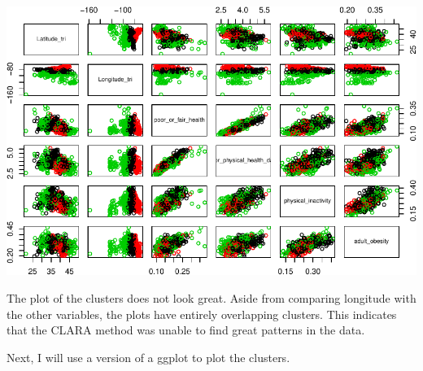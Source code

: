 \documentclass[12pt,twoside]{amherstthesis}
\begin{document}
  \begin{Shaded}
  \begin{Highlighting}[]
  \OperatorTok{$}
  \OperatorTok{$} \OperatorTok{:}\NormalTok{, } \NormalTok{)}
  \end{Highlighting}
  \end{Shaded}
  
  \begin{center}\includegraphics{Comps_Proj_files/figure-latex/unnamed-chunk-9-1} \end{center}
  
  The plot of the clusters does not look great. Aside from comparing
  longitude with the other variables, the plots have entirely overlapping
  clusters. This indicates that the CLARA method was unable to find great
  patterns in the data.
  
  Next, I will use a version of a ggplot to plot the clusters.
  
  \begin{Shaded}
  \begin{Highlighting}[]
  \OperatorTok{::}
  \end{Highlighting}
  \end{Shaded}
  
\end{document}
